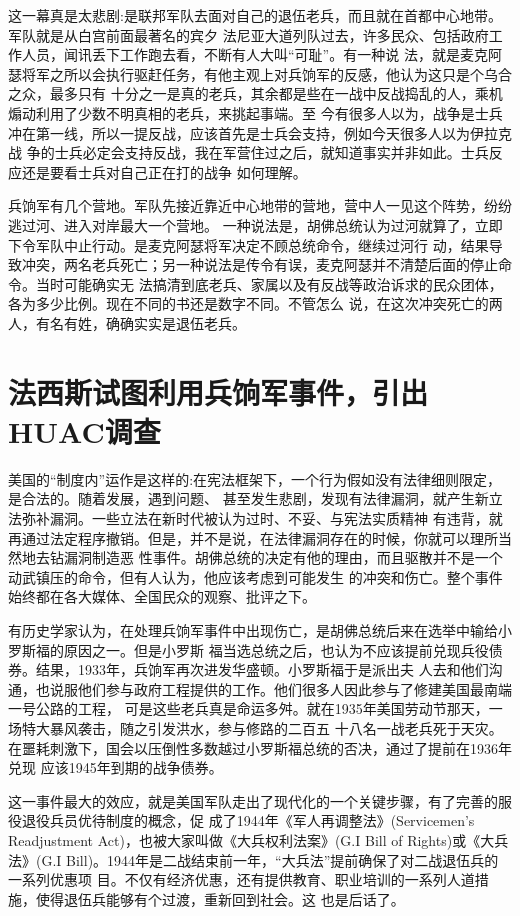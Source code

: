 \documentclass[10pt]{article}
\begin{document}
{这一幕真是太悲剧:是联邦军队去面对自己的退伍老兵，而且就在首都中心地带。军队就是从白宫前面最著名的宾夕
法尼亚大道列队过去，许多民众、包括政府工作人员，闻讯丢下工作跑去看，不断有人大叫``可耻''。有一种说
法，就是麦克阿瑟将军之所以会执行驱赶任务，有他主观上对兵饷军的反感，他认为这只是个乌合之众，最多只有
十分之一是真的老兵，其余都是些在一战中反战捣乱的人，乘机煽动利用了少数不明真相的老兵，来挑起事端。至
今有很多人以为，战争是士兵冲在第一线，所以一提反战，应该首先是士兵会支持，例如今天很多人以为伊拉克战
争的士兵必定会支持反战，我在军营住过之后，就知道事实并非如此。士兵反应还是要看士兵对自己正在打的战争
如何理解。

兵饷军有几个营地。军队先接近靠近中心地带的营地，营中人一见这个阵势，纷纷逃过河、进入对岸最大一个营地。
一种说法是，胡佛总统认为过河就算了，立即下令军队中止行动。是麦克阿瑟将军决定不顾总统命令，继续过河行
动，结果导致冲突，两名老兵死亡；另一种说法是传令有误，麦克阿瑟并不清楚后面的停止命令。当时可能确实无
法搞清到底老兵、家属以及有反战等政治诉求的民众团体，各为多少比例。现在不同的书还是数字不同。不管怎么
说，在这次冲突死亡的两人，有名有姓，确确实实是退伍老兵。

\pagebreak
\section{法西斯试图利用兵饷军事件，引出HUAC调查}

美国的``制度内''运作是这样的:在宪法框架下，一个行为假如没有法律细则限定，是合法的。随着发展，遇到问题、
甚至发生悲剧，发现有法律漏洞，就产生新立法弥补漏洞。一些立法在新时代被认为过时、不妥、与宪法实质精神
有违背，就再通过法定程序撤销。但是，并不是说，在法律漏洞存在的时候，你就可以理所当然地去钻漏洞制造恶
性事件。胡佛总统的决定有他的理由，而且驱散并不是一个动武镇压的命令，但有人认为，他应该考虑到可能发生
的冲突和伤亡。整个事件始终都在各大媒体、全国民众的观察、批评之下。

有历史学家认为，在处理兵饷军事件中出现伤亡，是胡佛总统后来在选举中输给小罗斯福的原因之一。但是小罗斯
福当选总统之后，也认为不应该提前兑现兵役债券。结果，1933年，兵饷军再次进发华盛顿。小罗斯福于是派出夫
人去和他们沟通，也说服他们参与政府工程提供的工作。他们很多人因此参与了修建美国最南端一号公路的工程，
可是这些老兵真是命运多舛。就在1935年美国劳动节那天，一场特大暴风袭击，随之引发洪水，参与修路的二百五
十八名一战老兵死于天灾。在噩耗刺激下，国会以压倒性多数越过小罗斯福总统的否决，通过了提前在1936年兑现
应该1945年到期的战争债券。

这一事件最大的效应，就是美国军队走出了现代化的一个关键步骤，有了完善的服役退役兵员优待制度的概念，促
成了1944年《军人再调整法》(Servicemen's Readjustment Act)，也被大家叫做《大兵权利法案》(G.I Bill of
Rights)或《大兵法》(G.I Bill)。1944年是二战结束前一年，``大兵法''提前确保了对二战退伍兵的一系列优惠项
目。不仅有经济优惠，还有提供教育、职业培训的一系列人道措施，使得退伍兵能够有个过渡，重新回到社会。这
也是后话了。

}
\end{document}
